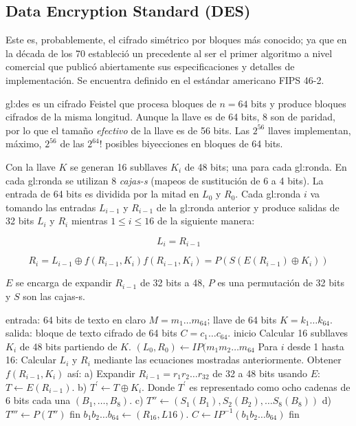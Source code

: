 \subsection{Data Encryption Standard (DES)}

Este es, probablemente, el cifrado simétrico por bloques más conocido;
ya que en la década de los 70 estableció un precedente al ser el primer
algoritmo a nivel comercial que publicó abiertamente sus
especificaciones y detalles de implementación. Se encuentra definido
en el estándar americano FIPS 46-2.

\acrshort{gl:des} es un cifrado Feistel que procesa bloques de $n=64$ bits y
produce bloques cifrados de la misma longitud. Aunque la llave es de 64 bits,
8 son de paridad, por lo que el tamaño \textit{efectivo} de la llave es de
56 bits. Las $2^{56}$ llaves implementan, máximo, $2^{56}$ de las
$2^{64}!$ posibles biyecciones en bloques de 64 bits.

Con la llave $K$ se generan 16 subllaves $K_i$ de 48 bits; una para cada
\gls{gl:ronda}. En cada \gls{gl:ronda} se utilizan 8 \textit{cajas-s}
(mapeos de sustitución de 6 a 4 bits). La entrada de 64 bits es dividida por la
mitad en $L_0$ y $R_0$. Cada \gls{gl:ronda} $i$ va tomando las entradas
$L_{i-1}$ y $R_{i-1}$ de la \gls{gl:ronda} anterior y produce salidas de 32
bits $L_i$ y $R_i$ mientras $1 \leq i \leq 16$ de la siguiente manera:

\begin{equation}
  \label{cifrado_des_li}
  L_i = R_{i-1}
\end{equation}

\begin{equation}
  \label{cifrado_des_di}
  R_i = L_{i-1} \oplus f(R_{i-1}, K_i)
  f(R_{i-1}, K_i) = P(S(E(R_{i-1})\oplus K_i))
\end{equation}

$E$ se encarga de expandir $R_{i-1}$ de 32 bits a 48, $P$ es una
permutación de 32 bits y $S$ son las cajas-s.

\begin{pseudocodigo}[caption={DES, cifrado.}, label={des:1}]
  entrada:  64 bits de texto en claro $M = m_1 \dots m_{64}$;
            llave de 64 bits $K = k_1 \dots k_{64}$.
  salida:   bloque de texto cifrado de 64 bits $C = c_1 \dots c_{64}$.
  inicio
    Calcular 16 subllaves $K_i$ de 48 bits partiendo de $K$.
    $(L_0, R_0) \leftarrow IP(m_1m_2\dots m_{64}$
    Para $i$ desde 1 hasta 16: Calcular $L_i$ y $R_i$ mediante las ecuaciones
    mostradas anteriormente.
    Obtener $f(R_{i-1}, K_i)$ así:
      a) Expandir $R_{i-1} = r_1r_2\dots r_{32}$ de 32 a 48 bits
         usando $E$: $T \leftarrow E(R_{i-1})$.
      b) $T^\prime \leftarrow T \oplus K_i$. Donde $T^\prime$ es representado
         como ocho cadenas de 6 bits cada una $(B_1, \dots, B_8)$.
      c) $T'' \leftarrow (S_1(B_1), S_2(B_2), \dots S_8(B_8))$
      d) $T''' \leftarrow P(T'')$
    fin
    $b_1b_2 \dots b_{64} \leftarrow (R_{16}, L{16})$.
    $C \leftarrow IP^{-1}(b_1b_2 \dots b_{64})$
  fin
\end{pseudocodigo}

